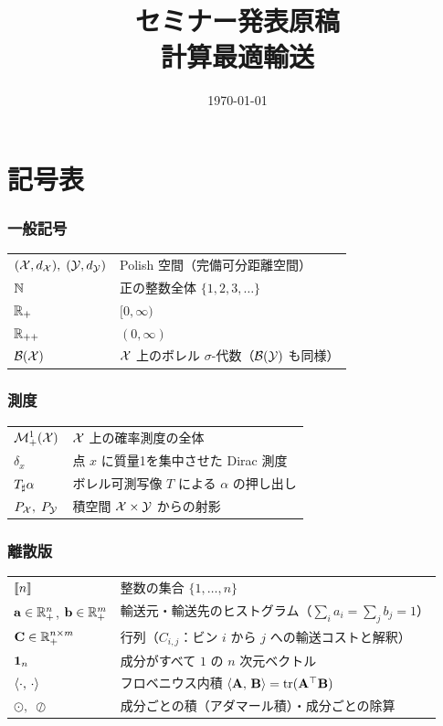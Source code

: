 \documentclass[uplatex, dvipdfmx]{jsreport}
\title{セミナー発表原稿\\{\Large 計算最適輸送}}
\author{}
\date{\today}
\begin{document}
\maketitle
\tableofcontents

\chapter*{記号表}

\subsection*{一般記号}
\begin{tabular}{ll}
  $(\mathcal{X}, d_{\mathcal{X}}),\; (\mathcal{Y}, d_{\mathcal{Y}})$ & Polish 空間（完備可分距離空間） \\
  $\mathbb{N}$ & 正の整数全体 $\{1, 2, 3, \ldots\}$ \\
  $\mathbb{R}_+$ & $[0,\infty)$ \\
  $\mathbb{R}_{++}$ & $(0,\infty)$ \\
  $\mathcal{B}(\mathcal{X})$ & $\mathcal{X}$ 上のボレル $\sigma$-代数（$\mathcal{B}(\mathcal{Y})$ も同様） \\
\end{tabular}

\subsection*{測度}
\begin{tabular}{ll}
  $\mathcal{M}_+^1(\mathcal{X})$ & $\mathcal{X}$ 上の確率測度の全体 \\
  $\delta_x$ & 点 $x$ に質量1を集中させた Dirac 測度 \\
  $T_\sharp \alpha$ & ボレル可測写像 $T$ による $\alpha$ の押し出し \\
  $P_{\mathcal{X}},\; P_{\mathcal{Y}}$ & 積空間 $\mathcal{X} \times \mathcal{Y}$ からの射影 \\
\end{tabular}

\subsection*{離散版}
\begin{tabular}{ll}
  $\llbracket n \rrbracket$ & 整数の集合 $\{1, \ldots, n\}$ \\
  $\mathbf{a} \in \mathbb{R}_+^n$, $\mathbf{b} \in \mathbb{R}_+^m$
    & 輸送元・輸送先のヒストグラム（$\sum_i a_i = \sum_j b_j = 1$） \\
  $\mathbf{C} \in \mathbb{R}_+^{n \times m}$ & 行列（$C_{i,j}$：ビン $i$ から $j$ への輸送コストと解釈） \\
  $\mathbf{1}_n$ & 成分がすべて $1$ の $n$ 次元ベクトル \\
  $\langle \cdot,\, \cdot \rangle$ & フロベニウス内積 $\langle \mathbf{A},\, \mathbf{B} \rangle = \operatorname{tr}(\mathbf{A}^\top \mathbf{B})$ \\
  $\odot,\; \oslash$ & 成分ごとの積（アダマール積）・成分ごとの除算 \\
\end{tabular}
\end{document}
